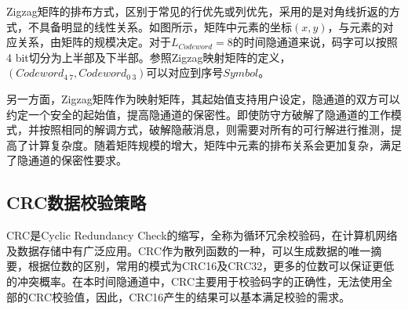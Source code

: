 
Zigzag矩阵的排布方式，区别于常见的行优先或列优先，采用的是对角线折返的方式，不具备明显的线性关系。如图所示，矩阵中元素的坐标$(x,y)$，与元素的对应关系，由矩阵的规模决定。对于$L_{Codeword}=8$的时间隐通道来说，码字可以按照4 bit切分为上半部及下半部。参照Zigzag映射矩阵的定义，$(Codeword_{4~7},Codeword_{0~3})$可以对应到序号$Symbol$。

另一方面，Zigzag矩阵作为映射矩阵，其起始值支持用户设定，隐通道的双方可以约定一个安全的起始值，提高隐通道的保密性。即使防守方破解了隐通道的工作模式，并按照相同的解调方式，破解隐蔽消息，则需要对所有的可行解进行推测，提高了计算复杂度。随着矩阵规模的增大，矩阵中元素的排布关系会更加复杂，满足了隐通道的保密性要求。

\subsection{CRC数据校验策略}
\label{chap:zigzag:motivation:crc}

CRC是Cyclic Redundancy Check的缩写，全称为循环冗余校验码，在计算机网络及数据存储中有广泛应用。CRC作为散列函数的一种，可以生成数据的唯一摘要，根据位数的区别，常用的模式为CRC16及CRC32，更多的位数可以保证更低的冲突概率。在本时间隐通道中，CRC主要用于校验码字的正确性，无法使用全部的CRC校验值，因此，CRC16产生的结果可以基本满足校验的需求。


